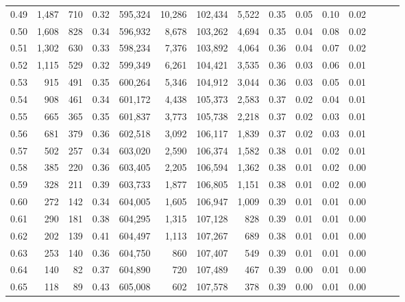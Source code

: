 \begin{tabular}{rrrrrrrrrrrrrrr}
0.49 &   1,487 &    710 &  0.32 &  595,324 &   10,286 &  102,434 &    5,522 &  0.35 &  0.05 &  0.10 &      0.02 \\
0.50 &   1,608 &    828 &  0.34 &  596,932 &    8,678 &  103,262 &    4,694 &  0.35 &  0.04 &  0.08 &      0.02 \\
0.51 &   1,302 &    630 &  0.33 &  598,234 &    7,376 &  103,892 &    4,064 &  0.36 &  0.04 &  0.07 &      0.02 \\
0.52 &   1,115 &    529 &  0.32 &  599,349 &    6,261 &  104,421 &    3,535 &  0.36 &  0.03 &  0.06 &      0.01 \\
0.53 &     915 &    491 &  0.35 &  600,264 &    5,346 &  104,912 &    3,044 &  0.36 &  0.03 &  0.05 &      0.01 \\
0.54 &     908 &    461 &  0.34 &  601,172 &    4,438 &  105,373 &    2,583 &  0.37 &  0.02 &  0.04 &      0.01 \\
0.55 &     665 &    365 &  0.35 &  601,837 &    3,773 &  105,738 &    2,218 &  0.37 &  0.02 &  0.03 &      0.01 \\
0.56 &     681 &    379 &  0.36 &  602,518 &    3,092 &  106,117 &    1,839 &  0.37 &  0.02 &  0.03 &      0.01 \\
0.57 &     502 &    257 &  0.34 &  603,020 &    2,590 &  106,374 &    1,582 &  0.38 &  0.01 &  0.02 &      0.01 \\
0.58 &     385 &    220 &  0.36 &  603,405 &    2,205 &  106,594 &    1,362 &  0.38 &  0.01 &  0.02 &      0.00 \\
0.59 &     328 &    211 &  0.39 &  603,733 &    1,877 &  106,805 &    1,151 &  0.38 &  0.01 &  0.02 &      0.00 \\
0.60 &     272 &    142 &  0.34 &  604,005 &    1,605 &  106,947 &    1,009 &  0.39 &  0.01 &  0.01 &      0.00 \\
0.61 &     290 &    181 &  0.38 &  604,295 &    1,315 &  107,128 &      828 &  0.39 &  0.01 &  0.01 &      0.00 \\
0.62 &     202 &    139 &  0.41 &  604,497 &    1,113 &  107,267 &      689 &  0.38 &  0.01 &  0.01 &      0.00 \\
0.63 &     253 &    140 &  0.36 &  604,750 &      860 &  107,407 &      549 &  0.39 &  0.01 &  0.01 &      0.00 \\
0.64 &     140 &     82 &  0.37 &  604,890 &      720 &  107,489 &      467 &  0.39 &  0.00 &  0.01 &      0.00 \\
0.65 &     118 &     89 &  0.43 &  605,008 &      602 &  107,578 &      378 &  0.39 &  0.00 &  0.01 &      0.00 \\

\end{tabular}
